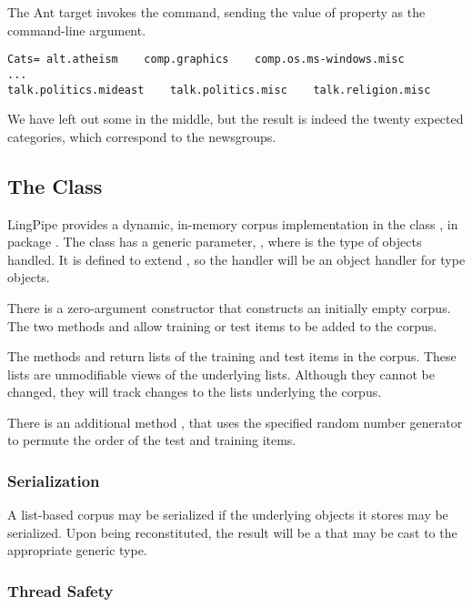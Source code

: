 The Ant target  invokes the
 command, sending the value of property
 as the command-line argument.
%
\begin{verbatim}
Cats= alt.atheism    comp.graphics    comp.os.ms-windows.misc
...
talk.politics.mideast    talk.politics.misc    talk.religion.misc
\end{verbatim}
%
We have left out some in the middle, but the result is indeed the
twenty expected categories, which correspond to the newsgroups.


\subsection{The  Class}

LingPipe provides a dynamic, in-memory corpus implementation in the
class , in package .  The
class has a generic parameter, , where  is
the type of objects handled.  It is defined to extend
, so the handler will be an object
handler for type  objects.

There is a zero-argument constructor  that
constructs an initially empty corpus.  The two methods
 and  allow training or test items
to be added to the corpus.

The methods  and  return lists of
the training and test items in the corpus.  These lists are
unmodifiable views of the underlying lists.  Although they cannot be
changed, they will track changes to the lists underlying the corpus.

There is an additional method , that uses
the specified random number generator to permute the order of the test
and training items.

\subsubsection{Serialization}

A list-based corpus may be serialized if the underlying objects
it stores may be serialized.  Upon being reconstituted, the result
will be a  that may be cast to the appropriate
generic type.

\subsubsection{Thread Safety}

